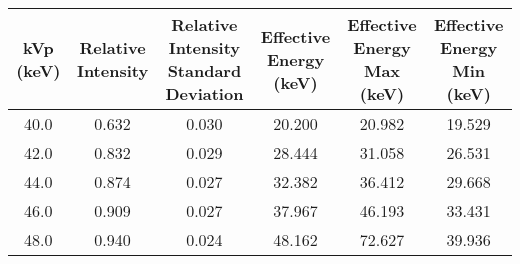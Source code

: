 \begin{tabular}{cccccc}
\toprule
 kVp (keV) &  Relative Intensity &  Relative Intensity Standard Deviation &  Effective Energy (keV) &  Effective Energy Max (keV) &  Effective Energy Min (keV) \\
\midrule
      40.0 &               0.632 &                                  0.030 &                  20.200 &                      20.982 &                      19.529 \\
      42.0 &               0.832 &                                  0.029 &                  28.444 &                      31.058 &                      26.531 \\
      44.0 &               0.874 &                                  0.027 &                  32.382 &                      36.412 &                      29.668 \\
      46.0 &               0.909 &                                  0.027 &                  37.967 &                      46.193 &                      33.431 \\
      48.0 &               0.940 &                                  0.024 &                  48.162 &                      72.627 &                      39.936 \\
\bottomrule
\end{tabular}
